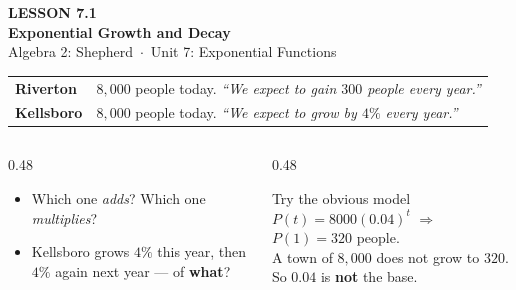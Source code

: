 \documentclass[aspectratio=169, 11pt]{beamer}
\begin{document}
{
\begin{frame}[plain]
  \vspace{2.8cm}\hspace{0.55cm}%
  \begin{minipage}{0.9\textwidth}
    {\color{goldacc}\bfseries\small LESSON 7.1}\\[0.5cm]
    {\color{white}\bfseries\LARGE Exponential Growth and Decay}\\[1.2cm]
    {\color{forestmid}\small Algebra 2: Shepherd~$\cdot$~Unit 7: Exponential Functions}
  \end{minipage}
\end{frame}
}

\begin{frame}[t, plain]
  \begin{center}
  \renewcommand{\arraystretch}{1.5}
  \begin{tabular}{ll}
  \hline
  \textbf{Riverton} & $8{,}000$ people today. \emph{``We expect to gain $300$ people every year.''} \\
  \textbf{Kellsboro} & $8{,}000$ people today. \emph{``We expect to grow by $4\%$ every year.''} \\
  \hline
  \end{tabular}
  \end{center}
  \vspace{6pt}
  \begin{columns}[T]
    \begin{column}{0.48\textwidth}
      \begin{itemize}\setlength{\itemsep}{4pt}
        \item Which one \emph{adds}? Which one \emph{multiplies}?
        \item Kellsboro grows $4\%$ this year, then $4\%$ again next year --- of \textbf{what}?
      \end{itemize}
    \end{column}
    \begin{column}{0.48\textwidth}
      \begin{block}{Try the obvious model}
        $P(t)=8000(0.04)^{t}$ \quad$\Rightarrow$\quad $P(1)=320$ people. \\[3pt]
        A town of $8{,}000$ does not grow to $320$. So $0.04$ is \textbf{not} the base.
      \end{block}
    \end{column}
  \end{columns}
\end{frame}
\end{document}
